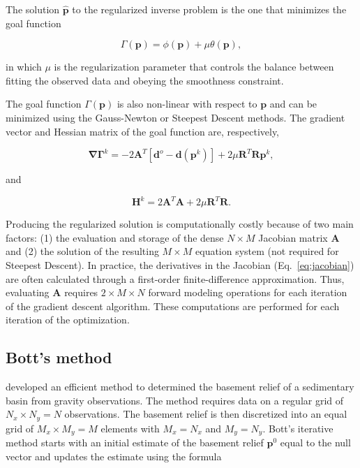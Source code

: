 \documentclass[extra,mreferee]{gji}
\begin{document}
The solution $\hat{\mathbf{p}}$ to the regularized inverse problem is the one that
minimizes the goal function

\begin{equation}
    \Gamma(\mathbf{p}) = \phi(\mathbf{p}) + \mu\theta(\mathbf{p}),
\end{equation}

\noindent
in which $\mu$ is the regularization parameter that controls the balance
between fitting the observed data and obeying the smoothness constraint.

The goal function $\Gamma(\mathbf{p})$ is also non-linear with respect to
$\mathbf{p}$ and can be minimized using the Gauss-Newton or Steepest Descent
methods.
The gradient vector and Hessian matrix of the goal function are, respectively,

\begin{equation}
    \mathbf{\nabla\Gamma}^k =
        -2\mathbf{A}^T[\mathbf{d}^o - \mathbf{d}(\mathbf{p}^k)] +
        2\mu\mathbf{R}^T\mathbf{R}\mathbf{p}^k,
    \label{eq:gradient-regul}
\end{equation}

\noindent and

\begin{equation}
    \mathbf{H}^k = 2\mathbf{A}^T\mathbf{A} + 2\mu\mathbf{R}^T\mathbf{R}.
    \label{eq:hessian-regul}
\end{equation}

Producing the regularized solution is computationally costly because of two
main factors:
(1) the evaluation and storage of the dense $N \times M$ Jacobian matrix
$\mathbf{A}$
and (2) the solution of the resulting $M \times M$ equation system
(not required for Steepest Descent).
In practice, the derivatives in the Jacobian (Eq.~\ref{eq:jacobian})
are often calculated through a first-order finite-difference approximation.
Thus, evaluating $\mathbf{A}$ requires $2\times M \times N$ forward modeling
operations for each iteration of the gradient descent algorithm.
These computations are performed for each iteration of the optimization.


\subsection{Bott's method}

\citet{bott1960} developed an efficient method to determined the basement
relief of a sedimentary basin from gravity observations.
The method requires data on a regular grid of $N_x \times N_y = N$
observations.
The basement relief is then discretized into an equal grid of $M_x \times
M_y = M$ elements with $M_x = N_x$ and $M_y = N_y$.
Bott's iterative method starts with an initial estimate of the basement relief
$\mathbf{p}^0$ equal to the null vector and updates the estimate using the formula
\end{document}
